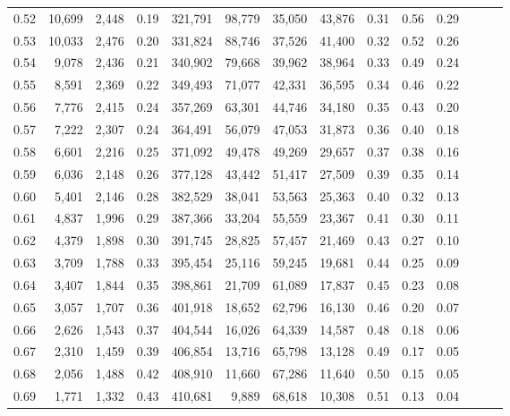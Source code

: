 \begin{tabular}{rrrrrrrrrrrrrr}
0.52 &  10,699 &  2,448 &  0.19 &  321,791 &   98,779 &  35,050 &  43,876 &  0.31 &  0.56 &      0.29 \\
0.53 &  10,033 &  2,476 &  0.20 &  331,824 &   88,746 &  37,526 &  41,400 &  0.32 &  0.52 &      0.26 \\
0.54 &   9,078 &  2,436 &  0.21 &  340,902 &   79,668 &  39,962 &  38,964 &  0.33 &  0.49 &      0.24 \\
0.55 &   8,591 &  2,369 &  0.22 &  349,493 &   71,077 &  42,331 &  36,595 &  0.34 &  0.46 &      0.22 \\
0.56 &   7,776 &  2,415 &  0.24 &  357,269 &   63,301 &  44,746 &  34,180 &  0.35 &  0.43 &      0.20 \\
0.57 &   7,222 &  2,307 &  0.24 &  364,491 &   56,079 &  47,053 &  31,873 &  0.36 &  0.40 &      0.18 \\
0.58 &   6,601 &  2,216 &  0.25 &  371,092 &   49,478 &  49,269 &  29,657 &  0.37 &  0.38 &      0.16 \\
0.59 &   6,036 &  2,148 &  0.26 &  377,128 &   43,442 &  51,417 &  27,509 &  0.39 &  0.35 &      0.14 \\
0.60 &   5,401 &  2,146 &  0.28 &  382,529 &   38,041 &  53,563 &  25,363 &  0.40 &  0.32 &      0.13 \\
0.61 &   4,837 &  1,996 &  0.29 &  387,366 &   33,204 &  55,559 &  23,367 &  0.41 &  0.30 &      0.11 \\
0.62 &   4,379 &  1,898 &  0.30 &  391,745 &   28,825 &  57,457 &  21,469 &  0.43 &  0.27 &      0.10 \\
0.63 &   3,709 &  1,788 &  0.33 &  395,454 &   25,116 &  59,245 &  19,681 &  0.44 &  0.25 &      0.09 \\
0.64 &   3,407 &  1,844 &  0.35 &  398,861 &   21,709 &  61,089 &  17,837 &  0.45 &  0.23 &      0.08 \\
0.65 &   3,057 &  1,707 &  0.36 &  401,918 &   18,652 &  62,796 &  16,130 &  0.46 &  0.20 &      0.07 \\
0.66 &   2,626 &  1,543 &  0.37 &  404,544 &   16,026 &  64,339 &  14,587 &  0.48 &  0.18 &      0.06 \\
0.67 &   2,310 &  1,459 &  0.39 &  406,854 &   13,716 &  65,798 &  13,128 &  0.49 &  0.17 &      0.05 \\
0.68 &   2,056 &  1,488 &  0.42 &  408,910 &   11,660 &  67,286 &  11,640 &  0.50 &  0.15 &      0.05 \\
0.69 &   1,771 &  1,332 &  0.43 &  410,681 &    9,889 &  68,618 &  10,308 &  0.51 &  0.13 &      0.04 \\

\end{tabular}
